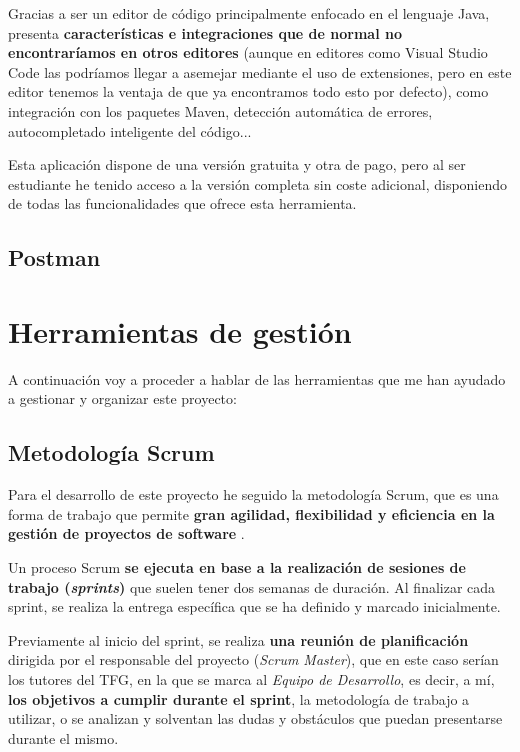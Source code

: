 Gracias a ser un editor de código principalmente enfocado en el lenguaje Java, presenta \textbf{características e integraciones que de normal no encontraríamos en otros editores} (aunque en editores como Visual Studio Code las podríamos llegar a asemejar mediante el uso de extensiones, pero en este editor tenemos la ventaja de que ya encontramos todo esto por defecto), como integración con los paquetes Maven, detección automática de errores, autocompletado inteligente del código... \cite{jetbrains:idea}

Esta aplicación dispone de una versión gratuita y otra de pago, pero al ser estudiante he tenido acceso a la versión completa sin coste adicional, disponiendo de todas las funcionalidades que ofrece esta herramienta. \cite{jetbrains:students}

\subsection{Postman}



\section{Herramientas de gestión}

A continuación voy a proceder a hablar de las herramientas que me han ayudado a gestionar y organizar este proyecto:

\subsection{Metodología Scrum}

Para el desarrollo de este proyecto he seguido la metodología Scrum, que es una forma de trabajo que permite \textbf{gran agilidad, flexibilidad y eficiencia en la gestión de proyectos de software} \cite{atlassian:scrum}.

Un proceso Scrum \textbf{se ejecuta en base a la realización de sesiones de trabajo (\textit{sprints})} que suelen tener dos semanas de duración. Al finalizar cada sprint, se realiza la entrega específica que se ha definido y marcado inicialmente.

Previamente al inicio del sprint, se realiza \textbf{una reunión de planificación} dirigida por el responsable del proyecto (\textit{Scrum Master}), que en este caso serían los tutores del TFG, en la que se marca al \textit{Equipo de Desarrollo}, es decir, a mí, \textbf{los objetivos a cumplir durante el sprint}, la metodología de trabajo a utilizar, o se analizan y solventan las dudas y obstáculos que puedan presentarse durante el mismo.

